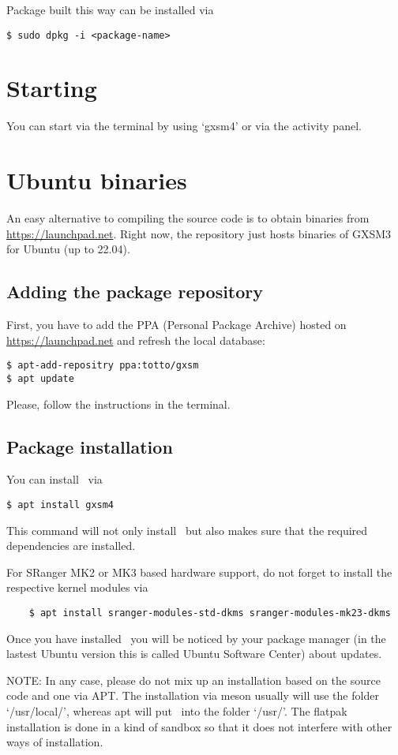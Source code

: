 Package built this way can be installed via 
\begin{verbatim}
$ sudo dpkg -i <package-name>
\end{verbatim}

\section{Starting \Gxsm}

You can start \Gxsm via the terminal by using `gxsm4' or via the activity panel.

\section{Ubuntu binaries}
An easy alternative to compiling the source code is to obtain binaries from \url{https://launchpad.net}. Right now, the repository just hosts binaries of GXSM3 for Ubuntu (up to 22.04).

\subsection{Adding the package repository}
First, you have to add the PPA (Personal Package Archive) hosted on \url{https://launchpad.net} and refresh the local database:

\begin{verbatim}
$ apt-add-repositry ppa:totto/gxsm
$ apt update
\end{verbatim}

Please, follow the instructions in the terminal.

\subsection{Package installation}
You can install \Gxsm\ via

\begin{verbatim}
$ apt install gxsm4 
\end{verbatim}

This command will not only install \Gxsm\ but also makes sure that the required dependencies are installed. 

For SRanger MK2 or MK3 based hardware support, do not forget to install the respective kernel modules via

\begin{verbatim}
	$ apt install sranger-modules-std-dkms sranger-modules-mk23-dkms
\end{verbatim}

Once you have installed \Gxsm\ you will be noticed by your package manager (in the lastest Ubuntu version this is called Ubuntu Software Center) about updates.

NOTE: In any case, please do not mix up an installation based on the source code and one via APT. The installation via meson usually will use the folder `/usr/local/', whereas apt will put \Gxsm\ into the folder `/usr/'. The flatpak installation is done in a kind of sandbox so that it does not interfere with other ways of installation.



